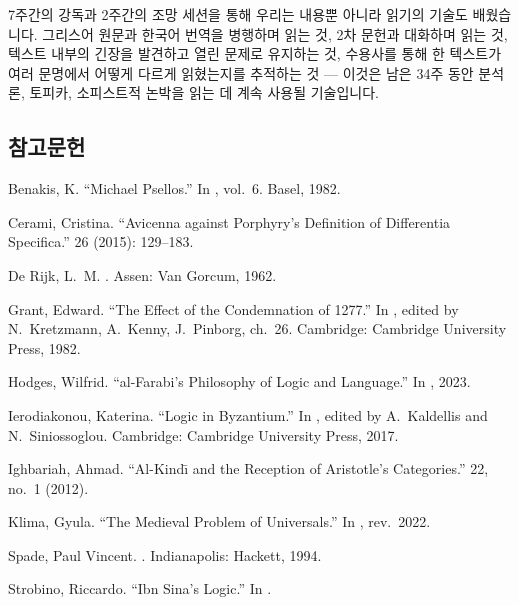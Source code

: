 \documentclass[12pt, a4paper]{article}
\begin{document}
7주간의 강독과 2주간의 조망 세션을 통해 우리는 내용뿐 아니라 읽기의 기술도 배웠습니다. 그리스어 원문과 한국어 번역을 병행하며 읽는 것, 2차 문헌과 대화하며 읽는 것, 텍스트 내부의 긴장을 발견하고 열린 문제로 유지하는 것, 수용사를 통해 한 텍스트가 여러 문명에서 어떻게 다르게 읽혔는지를 추적하는 것 --- 이것은 남은 34주 동안 분석론, 토피카, 소피스트적 논박을 읽는 데 계속 사용될 기술입니다.

\subsection*{참고문헌}
\begin{references}

 Benakis, K. ``Michael Psellos.'' In , vol.\ 6. Basel, 1982.

 Cerami, Cristina. ``Avicenna against Porphyry's Definition of Differentia Specifica.''  26 (2015): 129--183.

 De Rijk, L.\ M. . Assen: Van Gorcum, 1962.

 Grant, Edward. ``The Effect of the Condemnation of 1277.'' In , edited by N.\ Kretzmann, A.\ Kenny, J.\ Pinborg, ch.\ 26. Cambridge: Cambridge University Press, 1982.

 Hodges, Wilfrid. ``al-Farabi's Philosophy of Logic and Language.'' In , 2023.

 Ierodiakonou, Katerina. ``Logic in Byzantium.'' In , edited by A.\ Kaldellis and N.\ Siniossoglou. Cambridge: Cambridge University Press, 2017.

 Ighbariah, Ahmad. ``Al-Kind\=\i{} and the Reception of Aristotle's Categories.''  22, no.\ 1 (2012).

 Klima, Gyula. ``The Medieval Problem of Universals.'' In , rev.\ 2022.

 Spade, Paul Vincent. . Indianapolis: Hackett, 1994.

 Strobino, Riccardo. ``Ibn Sina's Logic.'' In .

\end{references}
\end{document}
